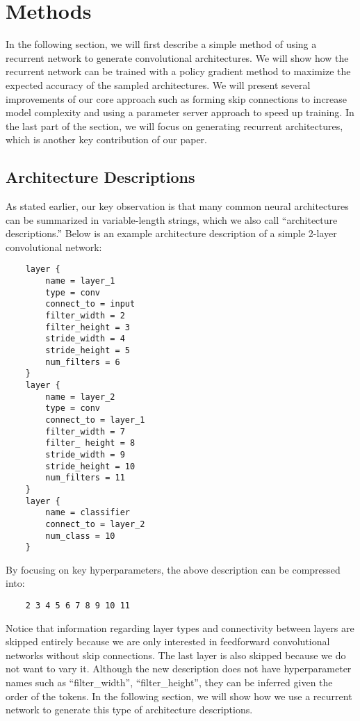 \documentclass{article} \usepackage{iclr2017_conference,times}
\begin{document}
\section{Methods}
\label{sec:methods}
In the following section, we will first describe a simple method of using a recurrent network to generate convolutional architectures. We will show how the recurrent network can be trained with a policy gradient method to maximize the expected accuracy of the sampled architectures. We will present several improvements of our core approach such as forming skip connections to increase model complexity and using a parameter server approach to speed up training. In the last part of the section, we will focus on generating recurrent architectures, which is another key contribution of our paper.

\iffalse
\subsection{Architecture Descriptions}
As stated earlier, our key observation is that many common neural architectures can be summarized in variable-length strings, which we also call ``architecture descriptions.'' Below is an example architecture description of a simple 2-layer convolutional network:
\begin{verbatim}
    layer {
        name = layer_1
        type = conv
        connect_to = input
        filter_width = 2
        filter_height = 3
        stride_width = 4
        stride_height = 5
        num_filters = 6
    }
    layer {
        name = layer_2
        type = conv
        connect_to = layer_1
        filter_width = 7
        filter_ height = 8
        stride_width = 9
        stride_height = 10
        num_filters = 11
    }
    layer {
        name = classifier
        connect_to = layer_2
        num_class = 10
    }
\end{verbatim}
By focusing on key hyperparameters, the above description can be compressed into:
\begin{verbatim}
    2 3 4 5 6 7 8 9 10 11
\end{verbatim}
Notice that information regarding layer types and connectivity between layers are skipped entirely because we are only interested in feedforward convolutional networks without skip connections. The last layer is also skipped because we do not want to vary it. Although the new description does not have hyperparameter names such as ``filter\_width'', ``filter\_height'', they can be inferred given the order of the tokens.   In the following section, we will show how we use a recurrent network to generate this type of architecture descriptions.
\end{document}
